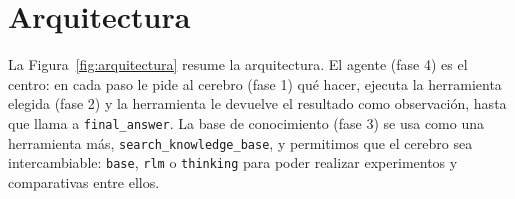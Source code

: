 \section{Arquitectura}

La Figura~\ref{fig:arquitectura} resume la arquitectura. El agente (fase 4) es el centro: en cada paso le pide al cerebro (fase 1) qué hacer, ejecuta la herramienta elegida (fase 2) y la herramienta le devuelve el resultado como observación, hasta que llama a \texttt{final\_\allowbreak{}answer}. La base de conocimiento (fase 3) se usa como una herramienta más, \texttt{search\_\allowbreak{}knowledge\_\allowbreak{}base}, y permitimos que el cerebro sea intercambiable: \texttt{base}, \texttt{rlm} o \texttt{thinking} para poder realizar experimentos y comparativas entre ellos.

